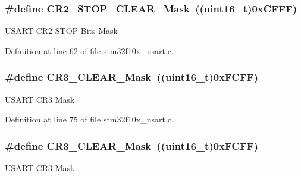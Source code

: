 \subsubsection[{\texorpdfstring{C\+R2\+\_\+\+S\+T\+O\+P\+\_\+\+C\+L\+E\+A\+R\+\_\+\+Mask}{CR2_STOP_CLEAR_Mask}}]{\setlength{\rightskip}{0pt plus 5cm}\#define C\+R2\+\_\+\+S\+T\+O\+P\+\_\+\+C\+L\+E\+A\+R\+\_\+\+Mask~(({\bf uint16\+\_\+t})0x\+C\+F\+F\+F)}\hypertarget{group___u_s_a_r_t___private___defines_ga8a2294276016f30cb361a7f54ad07cd4}{}\label{group___u_s_a_r_t___private___defines_ga8a2294276016f30cb361a7f54ad07cd4}
U\+S\+A\+RT C\+R2 S\+T\+OP Bits Mask 

Definition at line 62 of file stm32f10x\+\_\+usart.\+c.

\subsubsection[{\texorpdfstring{C\+R3\+\_\+\+C\+L\+E\+A\+R\+\_\+\+Mask}{CR3_CLEAR_Mask}}]{\setlength{\rightskip}{0pt plus 5cm}\#define C\+R3\+\_\+\+C\+L\+E\+A\+R\+\_\+\+Mask~(({\bf uint16\+\_\+t})0x\+F\+C\+F\+F)}\hypertarget{group___u_s_a_r_t___private___defines_ga085e8ef6bc8f5de45c5be95971715f7f}{}\label{group___u_s_a_r_t___private___defines_ga085e8ef6bc8f5de45c5be95971715f7f}
U\+S\+A\+RT C\+R3 Mask 

Definition at line 75 of file stm32f10x\+\_\+usart.\+c.

\subsubsection[{\texorpdfstring{C\+R3\+\_\+\+C\+L\+E\+A\+R\+\_\+\+Mask}{CR3_CLEAR_Mask}}]{\setlength{\rightskip}{0pt plus 5cm}\#define C\+R3\+\_\+\+C\+L\+E\+A\+R\+\_\+\+Mask~(({\bf uint16\+\_\+t})0x\+F\+C\+F\+F)}\hypertarget{group___u_s_a_r_t___private___defines_ga085e8ef6bc8f5de45c5be95971715f7f}{}\label{group___u_s_a_r_t___private___defines_ga085e8ef6bc8f5de45c5be95971715f7f}
U\+S\+A\+RT C\+R3 Mask 

